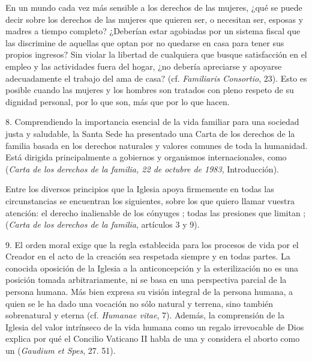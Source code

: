 \begin{body}
					En un mundo cada vez más sensible a los derechos de las mujeres, ¿qué se puede decir sobre los derechos de las mujeres que quieren ser, o necesitan ser, esposas y madres a tiempo completo? ¿Deberían estar agobiadas por un sistema fiscal que las discrimine de aquellas que optan por no quedarse en casa para tener sus propios ingresos? Sin violar la libertad de cualquiera que busque satisfacción en el empleo y las actividades fuera del hogar, ¿no debería apreciarse y apoyarse adecuadamente el trabajo del ama de casa? (cf. \emph{Familiaris Consortio}, 23). Esto es posible cuando las mujeres y los hombres son tratados con pleno respeto de su dignidad personal, por lo que son, más que por lo que hacen.
					
					8. Comprendiendo la importancia esencial de la vida familiar para una sociedad justa y saludable, la Santa Sede ha presentado una Carta de los derechos de la familia basada en los derechos naturales y valores comunes de toda la humanidad. Está dirigida principalmente a gobiernos y organismos internacionales, como  (\emph{Carta de los derechos de la familia, 22 de octubre de 1983}, Introducción).
					
					Entre los diversos principios que la Iglesia apoya firmemente en todas las circunstancias se encuentran los siguientes, sobre los que quiero llamar vuestra atención: el derecho inalienable de los cónyuges ; todas las presiones que limitan ;  (\emph{Carta de los derechos de la familia}, artículos 3 y 9).
					
					9. El orden moral exige que la regla establecida para los procesos de vida por el Creador en el acto de la creación sea respetada siempre y en todas partes. La conocida oposición de la Iglesia a la anticoncepción y la esterilización no es una posición tomada arbitrariamente, ni se basa en una perspectiva parcial de la persona humana. Más bien expresa su visión integral de la persona humana, a quien se le ha dado una vocación no sólo natural y terrena, sino también sobrenatural y eterna (cf. \emph{Humanae vitae}, 7). Además, la comprensión de la Iglesia del valor intrínseco de la vida humana como un regalo irrevocable de Dios explica por qué el Concilio Vaticano II habla de una  y considera el aborto como un  (\emph{Gaudium et Spes}, 27. 51).
					

\end{body}
